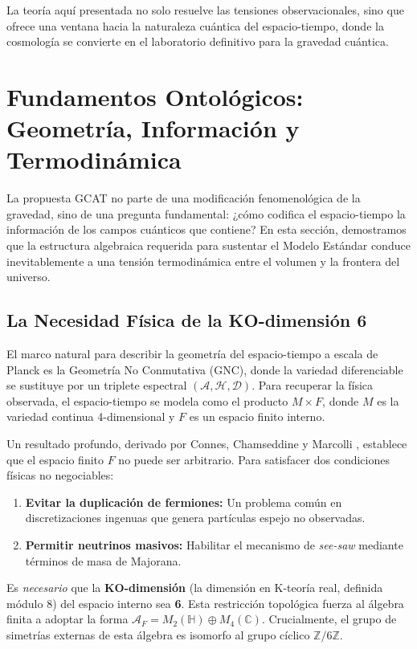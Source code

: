 \documentclass[12pt, a4paper]{article}
\theoremstyle{plain}
\theoremstyle{definition}
\begin{document}
La teoría aquí presentada no solo resuelve las tensiones observacionales, sino 
que ofrece una ventana hacia la naturaleza cuántica del espacio-tiempo, donde 
la cosmología se convierte en el laboratorio definitivo para la gravedad cuántica.

\section{Fundamentos Ontológicos: Geometría, Información y Termodinámica}
\label{sec:fundamentos}

La propuesta GCAT no parte de una modificación fenomenológica de la gravedad, sino de una pregunta fundamental: ¿cómo codifica el espacio-tiempo la información de los campos cuánticos que contiene? En esta sección, demostramos que la estructura algebraica requerida para sustentar el Modelo Estándar conduce inevitablemente a una tensión termodinámica entre el volumen y la frontera del universo.

\subsection{La Necesidad Física de la KO-dimensión 6}

El marco natural para describir la geometría del espacio-tiempo a escala de Planck es la Geometría No Conmutativa (GNC), donde la variedad diferenciable se sustituye por un triplete espectral $(\mathcal{A}, \mathcal{H}, \mathcal{D})$. Para recuperar la física observada, el espacio-tiempo se modela como el producto $M \times F$, donde $M$ es la variedad continua 4-dimensional y $F$ es un espacio finito interno.

Un resultado profundo, derivado por Connes, Chamseddine y Marcolli \cite{Connes2008, Chamseddine2012}, establece que el espacio finito $F$ no puede ser arbitrario. Para satisfacer dos condiciones físicas no negociables:
\begin{enumerate}
    \item \textbf{Evitar la duplicación de fermiones:} Un problema común en discretizaciones ingenuas que genera partículas espejo no observadas.
    \item \textbf{Permitir neutrinos masivos:} Habilitar el mecanismo de \textit{see-saw} mediante términos de masa de Majorana.
\end{enumerate}

Es \textit{necesario} que la \textbf{KO-dimensión} (la dimensión en K-teoría real, definida módulo 8) del espacio interno sea \textbf{6}. Esta restricción topológica fuerza al álgebra finita a adoptar la forma $\mathcal{A}_F = M_2(\mathbb{H}) \oplus M_4(\mathbb{C})$. Crucialmente, el grupo de simetrías externas de esta álgebra es isomorfo al grupo cíclico $\mathbb{Z}/6\mathbb{Z}$.
\end{document}
